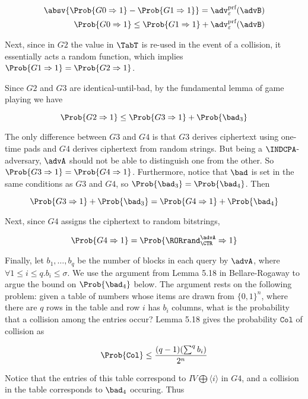 \begin{align*}
  \absv{\Prob{G0 \Rightarrow 1} - \Prob{G1 \Rightarrow 1}} = \adv^{\textup{prf}}_{\varepsilon}(\advB) \\
  \Prob{G0 \Rightarrow 1} \leq \Prob{G1 \Rightarrow 1} + \adv^{\textup{prf}}_{\varepsilon}(\advB) \\
\end{align*}

Next, since in $G2$ the value in $\TabT$ is re-used in the event of a collision,
it essentially acts a random function, which implies
$\Prob{G1 \Rightarrow 1} = \Prob{G2 \Rightarrow 1}$.

Since $G2$ and $G3$ are identical-until-bad, by the fundamental lemma of
game playing we have

$$
\Prob{G2 \Rightarrow 1} \leq \Prob{G3 \Rightarrow 1} + \Prob{\bad_3}
$$

The only difference between $G3$ and $G4$ is that $G3$ derives ciphertext
using one-time pads and $G4$ derives ciphertext from random strings. But being
a $\INDCPA$-adversary, $\advA$ should not be able to distinguish one from the
other. So $\Prob{G3 \Rightarrow 1} = \Prob{G4 \Rightarrow 1}$.
Furthermore, notice that $\bad$ is set in the same conditions as $G3$ and $G4$,
so $\Prob{\bad_3} = \Prob{\bad_4}$. Then

$$
\Prob{G3 \Rightarrow 1} + \Prob{\bad_3} = \Prob{G4 \Rightarrow 1} + \Prob{\bad_4}
$$

Next, since $G4$ assigns the ciphertext to random bitstrings,

$$
\Prob{G4 \Rightarrow 1} = \Prob{\RORrand^{\advA}_{\CTR} \Rightarrow 1}
$$

Finally, let $b_1, \ldots, b_q$ be the number of blocks in each query by
$\advA$, where $\forall 1 \leq i \leq q. b_i \leq \sigma$.
We use the argument from Lemma 5.18 in
Bellare-Rogaway to argue the bound on $\Prob{\bad_4}$ below.  The argument
rests on the following problem: given a table of numbers whose items are drawn
from $\{0,1\}^n$, where there are $q$ rows in the table and row $i$ has $b_i$
columns, what is the probability that a collision among the entries occur?
Lemma 5.18 gives the probability $\texttt{Col}$ of
collision as

$$
\Prob{\texttt{Col}} \leq \frac{(q-1)(\sum^q b_i)}{2^n}
$$

Notice that the entries of this table correspond to
$IV \bigoplus \langle i \rangle$ in $G4$,
and a collision in the table corresponds to $\bad_4$ occuring. Thus

